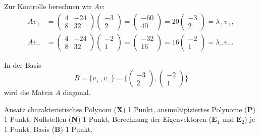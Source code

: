 \begin{loesung}
Zur Kontrolle berechnen wir $Av$:
\begin{align*}
Av_+
&=
\begin{pmatrix}4&-24\\8&32 \end{pmatrix}
\begin{pmatrix}-3\\2 \end{pmatrix}
=
\begin{pmatrix}
-60\\40
\end{pmatrix}
=
20
\begin{pmatrix}-3\\2 \end{pmatrix}
=
\lambda_+v_+,
\\
Av_-
&=
\begin{pmatrix}4&-24\\8&32 \end{pmatrix}
\begin{pmatrix}-2\\1 \end{pmatrix}
=
\begin{pmatrix}
-32\\16
\end{pmatrix}
=
16\begin{pmatrix}-2\\1\end{pmatrix}
=
\lambda_-v_-.
\end{align*}

In der Basis 
\[
B=\{v_+,v_-\}
=
\biggl\{
\begin{pmatrix}-3\\2 \end{pmatrix},
\begin{pmatrix}-2\\1 \end{pmatrix}
\biggr\}
\]
wird die Matrix $A$ diagonal.
\end{loesung}

\begin{bewertung}
Ansatz charakteristisches Polynom ({\bf X}) 1 Punkt,
ausmultipiziertes Polynome ({\bf P}) 1 Punkt,
Nullstellen ({\bf N}) 1 Punkt,
Berechnung der Eigenvektoren ($\textbf{E}_1$ und $\textbf{E}_2$) je 1 Punkt,
Basis ({\bf B}) 1 Punkt.
\end{bewertung}

